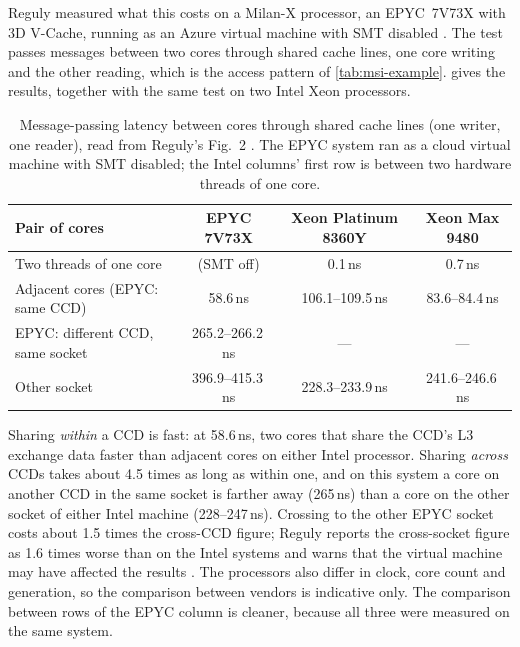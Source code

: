 Reguly measured what this costs on a Milan-X processor, an EPYC~7V73X with 3D V-Cache, running as an Azure virtual machine with SMT disabled \cite{regulyComparativeEvaluationBandwidthbound2023}. The test passes messages between two cores through shared cache lines, one core writing and the other reading, which is the access pattern of \cref{tab:msi-example}.  gives the results, together with the same test on two Intel Xeon processors.

\begin{table}[htbp]
  \centering
  \caption[Core-to-core message-passing latency (Reguly)]{Message-passing latency between cores through shared cache lines (one writer, one reader), read from Reguly's Fig.~2 \cite{regulyComparativeEvaluationBandwidthbound2023}. The EPYC system ran as a cloud virtual machine with SMT disabled; the Intel columns' first row is between two hardware threads of one core.}
  \label{tab:core-to-core}
  \small
  \begin{tabularx}{\textwidth}{@{}>{\raggedright\arraybackslash}X ccc@{}}
    \toprule
    \textbf{Pair of cores} & \textbf{EPYC 7V73X} & \textbf{Xeon Platinum 8360Y} & \textbf{Xeon Max 9480} \\
    \midrule
    Two threads of one core & (SMT off) & 0.1\,ns & 0.7\,ns \\
    Adjacent cores (EPYC: same CCD) & 58.6\,ns & 106.1--109.5\,ns & 83.6--84.4\,ns \\
    EPYC: different CCD, same socket & 265.2--266.2\,ns & --- & --- \\
    Other socket & 396.9--415.3\,ns & 228.3--233.9\,ns & 241.6--246.6\,ns \\
    \bottomrule
  \end{tabularx}
\end{table}

Sharing \emph{within} a CCD is fast: at 58.6\,ns, two cores that share the CCD's L3 exchange data faster than adjacent cores on either Intel processor. Sharing \emph{across} CCDs takes about 4.5 times as long as within one, and on this system a core on another CCD in the same socket is farther away (265\,ns) than a core on the other socket of either Intel machine (228--247\,ns). Crossing to the other EPYC socket costs about 1.5 times the cross-CCD figure; Reguly reports the cross-socket figure as 1.6 times worse than on the Intel systems and warns that the virtual machine may have affected the results \cite{regulyComparativeEvaluationBandwidthbound2023}. The processors also differ in clock, core count and generation, so the comparison between vendors is indicative only. The comparison between rows of the EPYC column is cleaner, because all three were measured on the same system.

